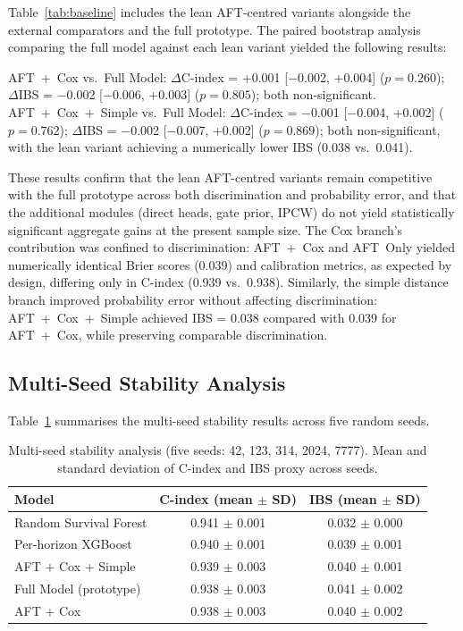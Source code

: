 \documentclass[fire,article,submit,pdftex]{../Definitions/mdpi}
\begin{document}
Table~\ref{tab:baseline} includes the lean AFT-centred variants alongside the external comparators and the full prototype.
The paired bootstrap analysis comparing the full model against each lean variant yielded the following results:

AFT~+~Cox vs.\ Full Model: $\Delta$C-index = +0.001 [$-$0.002, +0.004] ($p = 0.260$); $\Delta$IBS = $-$0.002 [$-$0.006, +0.003] ($p = 0.805$); both non-significant.
AFT~+~Cox~+~Simple vs.\ Full Model: $\Delta$C-index = $-$0.001 [$-$0.004, +0.002] ($p = 0.762$); $\Delta$IBS = $-$0.002 [$-$0.007, +0.002] ($p = 0.869$); both non-significant, with the lean variant achieving a numerically lower IBS (0.038 vs.\ 0.041).

These results confirm that the lean AFT-centred variants remain competitive with the full prototype across both discrimination and probability error, and that the additional modules (direct heads, gate prior, IPCW) do not yield statistically significant aggregate gains at the present sample size.
The Cox branch's contribution was confined to discrimination: AFT~+~Cox and AFT~Only yielded numerically identical Brier scores (0.039) and calibration metrics, as expected by design, differing only in C-index (0.939 vs.\ 0.938).
Similarly, the simple distance branch improved probability error without affecting discrimination: AFT~+~Cox~+~Simple achieved IBS = 0.038 compared with 0.039 for AFT~+~Cox, while preserving comparable discrimination.

\subsection{Multi-Seed Stability Analysis}\label{sec:stability}

Table~\ref{tab:stability} summarises the multi-seed stability results across five random seeds.

\begin{table}[!ht]
\caption{Multi-seed stability analysis (five seeds: 42, 123, 314, 2024, 7777). Mean and standard deviation of C-index and IBS proxy across seeds.}\label{tab:stability}
\begin{tabular}{lcc}
\toprule
\textbf{Model} & \textbf{C-index (mean $\pm$ SD)} & \textbf{IBS (mean $\pm$ SD)} \\
\midrule
Random Survival Forest & 0.941 $\pm$ 0.001 & 0.032 $\pm$ 0.000 \\
Per-horizon XGBoost    & 0.940 $\pm$ 0.001 & 0.039 $\pm$ 0.001 \\
AFT + Cox + Simple     & 0.939 $\pm$ 0.003 & 0.040 $\pm$ 0.001 \\
Full Model (prototype) & 0.938 $\pm$ 0.003 & 0.041 $\pm$ 0.002 \\
AFT + Cox              & 0.938 $\pm$ 0.003 & 0.040 $\pm$ 0.002 \\
\bottomrule
\end{tabular}
\end{table}
\end{document}
